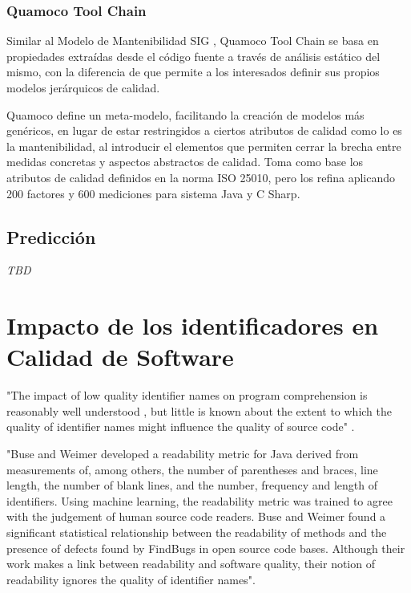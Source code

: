 \subsubsection{Quamoco Tool Chain}

Similar al Modelo de Mantenibilidad SIG \cite{Heitlager2007}, Quamoco Tool Chain \cite{Wagner2012}
se basa en propiedades extraídas desde el código fuente a través de análisis estático del mismo,
con la diferencia de que permite a los interesados definir sus propios modelos jerárquicos
de calidad.

Quamoco define un meta-modelo, facilitando la creación de modelos más genéricos, en lugar de
estar restringidos a ciertos atributos de calidad como lo es la mantenibilidad, al introducir
el elementos que permiten cerrar la brecha entre medidas concretas y aspectos abstractos de
calidad.
Toma como base los atributos de calidad definidos en la norma ISO 25010, pero los refina
aplicando 200 factores y 600 mediciones para sistema Java y C Sharp.

\subsection{Predicción}

\textit{TBD}

\section{Impacto de los identificadores en Calidad de Software}

"The impact of low quality identifier names on program comprehension is reasonably
well understood \cite{DeiBenbockPizka05,Lawrie2007,Lawrie2006}, but little is known
about the extent to which the quality of identifier names might influence the quality
of source code" \cite{ButlerWemelingerYu10}.

"Buse and Weimer \cite{Buse2008} developed a readability metric for Java derived from measurements 
of, among others, the number of parentheses and braces, line length, the number
of blank lines, and the number, frequency and length of identifiers.
Using machine learning, the readability metric was trained to agree with the judgement 
of human source code readers.
Buse and Weimer found a significant statistical relationship between the readability of 
methods and the presence of defects found by FindBugs in open source code bases. 
Although their work makes a link between readability and software quality, their notion
of readability ignores the quality of identifier names".

